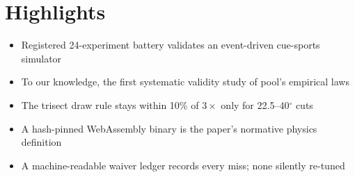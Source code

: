 \section*{Highlights}

\begin{itemize}
  \item Registered 24-experiment battery validates an event-driven cue-sports simulator
  \item To our knowledge, the first systematic validity study of pool's empirical laws
  \item The trisect draw rule stays within 10\% of $3\times$ only for 22.5--40$^\circ$ cuts
  \item A hash-pinned WebAssembly binary is the paper's normative physics definition
  \item A machine-readable waiver ledger records every miss; none silently re-tuned
\end{itemize}
